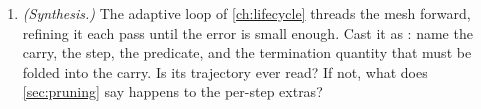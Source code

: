 \begin{enumerate}[nosep]
  : identify the bootstrap step (what is the first
  ``previous''?), the steady step, the carry, and the predicate. Then argue that
  the same sequence can be computed by plain  if you widen the
  carry to hold \emph{both} $F_k$ and $F_{k-1}$. What does
   buy over that widening?
  \item \emph{(Synthesis.)} The adaptive loop of \cref{ch:lifecycle} threads the
  mesh forward, refining it each pass until the error is small enough. Cast it as
  : name the carry, the step, the predicate, and the
  termination quantity that must be folded into the carry. Is its trajectory ever
  read? If not, what does \cref{sec:pruning} say happens to the per-step extras?
\end{enumerate}
